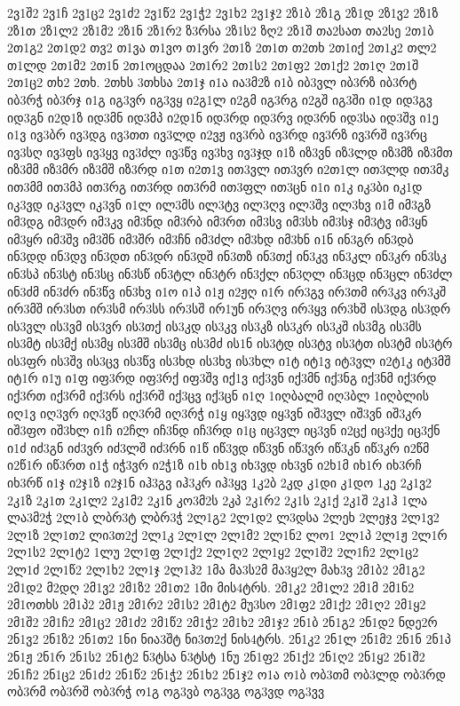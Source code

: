 {2ვ1შ2
2ვ1ჩ
2ვ1ც2
2ვ1ძ2
2ვ1წ2
2ვ1ჭ2
2ვ1ხ2
2ვ1ჯ2
2ზ1ბ
2ზ1გ
2ზ1დ
2ზ1ვ2
2ზ1ზ
2ზ1თ
2ზ1ლ2
2ზ1მ2
2ზ1ნ
2ზ1რ2
ზ3რსა
2ზ1ს2
ზღ2
2ზ1შ
თა2სათ
თა2სე
2თ1ბ
2თ1გ2
2თ1დ2
თვ2
თ1ვა
თ1ვო
თ1ვრ
2თ1ზ
2თ1თ
თ2თხ
2თ1იქ
2თ1კ2
თლ2
თ1ლდ
2თ1მ2
2თ1ნ
2თ1ოცდაა
2თ1რ2
2თ1ს2
2თ1ფ2
2თ1ქ2
2თ1ღ
2თ1შ
2თ1ც2
თხ2
2თხ.
2თხს
3თხსა
2თ1ჯ
ი1ა
ია3მ2ზ
ი1ბ
იბ3ვლ
იბ3რზ
იბ3რტ
იბ3რჭ
იბ3რჯ
ი1გ
იგ3ვრ
იგ3ვყ
ი2გ1ლ
ი2გმ
იგ3რგ
ი2გშ
იგ3ში
ი1დ
იდ3გვ
იდ3გნ
ი2დ1ზ
იდ3მნ
იდ3მპ
ი2დ1ნ
იდ3რდ
იდ3რვ
იდ3რნ
იდ3სა
იდ3შვ
ი1ე
ი1ვ
ივ3ბრ
ივ3დგ
ივ3თთ
ივ3ლდ
ი2ვჟ
ივ3რბ
ივ3რდ
ივ3რზ
ივ3რშ
ივ3რც
ივ3სღ
ივ3ფს
ივ3ყვ
ივ3ძლ
ივ3წვ
ივ3ხვ
ივ3ჯდ
ი1ზ
იზ3ვნ
იზ3ლდ
იზ3მზ
იზ3მთ
იზ3მმ
იზ3მრ
იზ3მშ
იზ3რდ
ი1თ
ი2თ1ვ
ით3ვლ
ით3ვრ
ი2თ1ლ
ით3ლდ
ით3მკ
ით3მმ
ით3მპ
ით3რგ
ით3რდ
ით3რმ
ით3ფლ
ით3ცნ
ი1ი
ი1კ
იკ3ბი
იკ1დ
იკ3ვდ
იკ3ვლ
იკ3ვნ
ი1ლ
ილ3მს
ილ3ტვ
ილ3ღვ
ილ3შვ
ილ3ხვ
ი1მ
იმ3გზ
იმ3დგ
იმ3დრ
იმ3კვ
იმ3ნდ
იმ3რბ
იმ3რთ
იმ3სვ
იმ3სხ
იმ3სჯ
იმ3ტვ
იმ3ყნ
იმ3ყრ
იმ3შვ
იმ3შნ
იმ3შრ
იმ3ჩნ
იმ3ძლ
იმ3ხდ
იმ3ხნ
ი1ნ
ინ3გრ
ინ3დბ
ინ3დდ
ინ3დვ
ინ3დთ
ინ3დრ
ინ3დშ
ინ3თზ
ინ3თქ
ინ3კვ
ინ3კლ
ინ3კრ
ინ3სკ
ინ3სპ
ინ3სტ
ინ3სც
ინ3სწ
ინ3ტლ
ინ3ტრ
ინ3ქლ
ინ3ღლ
ინ3ცდ
ინ3ცლ
ინ3ძლ
ინ3ძმ
ინ3ძრ
ინ3წვ
ინ3ხვ
ი1ო
ი1პ
ი1ჟ
ი2ჟღ
ი1რ
ირ3გვ
ირ3თმ
ირ3კვ
ირ3კშ
ირ3მშ
ირ3სთ
ირ3სმ
ირ3სს
ირ3სშ
ირ1უნ
ირ3ღვ
ირ3ყვ
ირ3ხშ
ის3დგ
ის3დრ
ის3ვლ
ის3ვმ
ის3ვრ
ის3თქ
ის3კდ
ის3კვ
ის3კზ
ის3კრ
ის3კშ
ის3მგ
ის3მს
ის3მტ
ის3მქ
ის3მყ
ის3მშ
ის3მც
ის3მძ
ის1ნ
ის3ტდ
ის3ტვ
ის3ტთ
ის3ტმ
ის3ტრ
ის3ფრ
ის3შვ
ის3ცვ
ის3წვ
ის3ხდ
ის3ხვ
ის3ხლ
ი1ტ
იტ1ვ
იტ3ვლ
ი2ტ1კ
იტ3მშ
იტ1რ
ი1უ
ი1ფ
იფ3რდ
იფ3რქ
იფ3შვ
იქ1ვ
იქ3ვნ
იქ3მნ
იქ3ნგ
იქ3ნმ
იქ3რდ
იქ3რთ
იქ3რმ
იქ3რს
იქ3რშ
იქ3ცვ
იქ3ცნ
ი1ღ
1იღბალმ
იღ3ბლ
1იღბლის
იღ1ვ
იღ3ვრ
იღ3ვწ
იღ3რმ
იღ3რჭ
ი1ყ
იყ3ვდ
იყ3ვნ
იშ3ვლ
იშ3ვნ
იშ3კრ
იშ3ფო
იშ3ხლ
ი1ჩ
ი2ჩლ
იჩ3ნდ
იჩ3რდ
ი1ც
იც3ვლ
იც3ვნ
ი2ცქ
იც3ქე
იც3ქნ
ი1ძ
იძ3გნ
იძ3ვრ
იძ3ლშ
იძ3რნ
ი1წ
იწ3ვდ
იწ3ვნ
იწ3ვრ
იწ3კნ
იწ3კრ
ი2წმ
ი2წ1რ
იწ3რთ
ი1ჭ
იჭ3ვრ
ი2ჭ1ზ
ი1ხ
იხ1ვ
იხ3ვდ
იხ3ვნ
ი2ხ1მ
იხ1რ
იხ3რჩ
იხ3რწ
ი1ჯ
ი2ჯ1ზ
ი2ჯ1ნ
იჰ3გვ
იჰ3კრ
იჰ3ყვ
1კ2ბ
2კდ
კ1დი
კ1დო
1კე
2კ1ვ2
2კ1ზ
2კ1თ
2კ1ლ2
2კ1მ2
2კ1ნ
კო3მ2ს
2კპ
2კ1რ2
2კ1ს
2კ1ქ
2კ1შ
2კ1ჰ
1ლა
ლა3მ2ჭ
2ლ1ბ
ლბრ3ტ
ლბრ3ჭ
2ლ1გ2
2ლ1დ2
ლ3დსა
2ლეხ
2ლეჯვ
2ლ1ვ2
2ლ1ზ
2ლ1თ2
ლი3თ2ქ
2ლ1კ
2ლ1ლ
2ლ1მ2
2ლ1ნ2
ლო1
2ლ1პ
2ლ1ჟ
2ლ1რ
2ლ1ს2
2ლ1ტ2
1ლუ
2ლ1ფ
2ლ1ქ2
2ლ1ღ2
2ლ1ყ2
2ლ1შ2
2ლ1ჩ2
2ლ1ც2
2ლ1ძ
2ლ1წ2
2ლ1ხ2
2ლ1ჯ
2ლ1ჰ2
1მა
მა3ს2მ
მა3ყ2ლ
მახ3ვ
2მ1ბ2
2მ1გ2
2მ1დ2
მ2დღ
2მ1ვ2
2მ1ზ2
2მ1თ2
1მი
მის4ტრს.
2მ1კ2
2მ1ლ2
2მ1მ
2მ1ნ2
2მ1ოთხს
2მ1პ2
2მ1ჟ
2მ1რ2
2მ1ს2
2მ1ტ2
მუ3სო
2მ1ფ2
2მ1ქ2
2მ1ღ2
2მ1ყ2
2მ1შ2
2მ1ჩ2
2მ1ც2
2მ1ძ2
2მ1წ2
2მ1ჭ2
2მ1ხ2
2მ1ჯ2
2ნ1ბ
2ნ1გ2
2ნ1დ2
ნდე2რ
2ნ1ვ2
2ნ1ზ2
2ნ1თ2
1ნი
ნია3შტ
ნი3თ2ქ
ნის4ტრს.
2ნ1კ2
2ნ1ლ
2ნ1მ2
2ნ1ნ
2ნ1პ
2ნ1ჟ
2ნ1რ
2ნ1ს2
2ნ1ტ2
ნ3ტსა
ნ3ტსტ
1ნუ
2ნ1ფ2
2ნ1ქ2
2ნ1ღ2
2ნ1ყ2
2ნ1შ2
2ნ1ჩ2
2ნ1ც2
2ნ1ძ2
2ნ1წ2
2ნ1ჭ2
2ნ1ხ2
2ნ1ჯ2
ო1ა
ო1ბ
ობ3თმ
ობ3ლდ
ობ3რდ
ობ3რმ
ობ3რშ
ობ3რჭ
ო1გ
ოგ3ვბ
ოგ3ვგ
ოგ3ვდ
ოგ3ვვ
}
